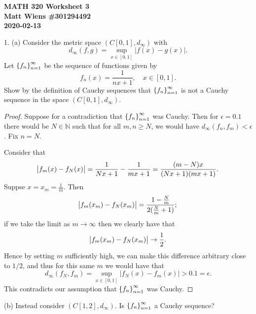 \documentclass{article}
\newcommand{\N}{\mathbb{N}}
\begin{document}
\textbf{MATH 320 Worksheet 3} \\
\textbf{Matt Wiens \#301294492} \\
\textbf{2020-02-13}

1. (a) Consider the metric space $(C[0, 1], d_\infty)$ with
%
\begin{equation*}
    d_\infty(f, g) = \sup_{x \in [0, 1]} |f(x) - g(x)|
    .
\end{equation*}
%
Let $\cbr{f_n}_{n = 1}^\infty$ be the sequence of functions given by
%
\begin{equation*}
    f_n(x) = \frac{1}{n x + 1}, \quad x \in [0, 1].
\end{equation*}
%
Show by the definition of Cauchy sequences that $\cbr{f_n}_{n =
1}^\infty$ is not a Cauchy sequence in the space $(C[0, 1], d_\infty)$.

\begin{proof}

Suppose for a contradiction that $\cbr{f_n}_{n = 1}^\infty$ was Cauchy.
Then for $\epsilon = 0.1$ there would be $N \in \N$ such that for all
$m, n \geq N$, we would have $d_\infty(f_n, f_m) < \epsilon$. Fix $n = N$.

Consider that
%
\begin{equation*}
    \envert{f_m(x) - f_N(x)}
        = \frac{1}{N x + 1} - \frac{1}{m x + 1}
        = \frac{(m - N) x}{(N x + 1) (m x + 1)}
        .
\end{equation*}
%
Suppse $x = x_m = \frac{1}{m}$. Then
%
\begin{equation*}
    \envert{f_m(x_m) - f_N(x_m)}
        = \frac{1 - \frac{N}{m}}{2 (\frac{N}{m} + 1)}
        ;
\end{equation*}
%
if we take the limit as $m \to \infty$ then we clearly have that
%
\begin{equation*}
    \envert{f_m(x_m) - f_N(x_m)} \to \frac{1}{2}
    .
\end{equation*}
%
Hence by setting $m$ sufficiently high, we can make this difference
arbitrary close to $1 / 2$, and thus for this same $m$ we would have
that
%
\begin{equation*}
    d_\infty(f_N, f_m) = \sup_{x \in [0, 1]} |f_N(x) - f_m(x)| > 0.1 = \epsilon
    .
\end{equation*}
%
This contradicts our assumption that $\cbr{f_n}_{n = 1}^\infty$ was Cauchy.

\end{proof}

\newpage

(b) Instead consider $(C[1, 2], d_\infty)$. Is $\cbr{f_n}_{n =
1}^\infty$ a Cauchy sequence?
\end{document}
